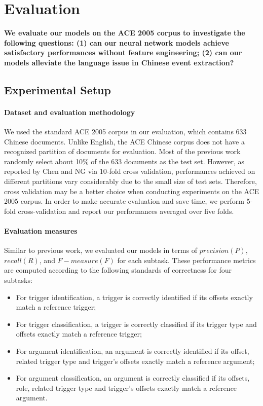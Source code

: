 \section{Evaluation}\label{experiments}
\textbf{We evaluate our models on the ACE 2005 corpus to investigate the following questions: (1) can our neural network models achieve satisfactory performances without feature engineering; (2) can our models alleviate the language issue in Chinese event extraction?}
\subsection{Experimental Setup}
\paragraph{Dataset and evaluation methodology}
We used the standard ACE 2005 corpus in our evaluation, which contains 633 Chinese documents. Unlike English, the ACE Chinese corpus does not have a recognized partition of documents for evaluation. Most of the previous work \cite{chen2009language,feng2016language} randomly select about 10\% of the 633 documents as the test set. However, as reported by Chen and NG  via 10-fold cross validation, performances achieved on different partitions vary considerably due to the small size of test sets. Therefore, cross validation may be a better choice when conducting experiments on the ACE 2005 corpus. In order to make accurate evaluation and save time, we perform 5-fold cross-validation and report our performances averaged over five folds.

\paragraph{Evaluation measures} Similar to previous work, we evaluated our models in terms of $precision (P)$, $recall (R)$, and $F{-}measure (F)$ for each subtask. These performance metrics are computed according to the following standards of correctness for four subtasks:
\begin{itemize}	
	\item For trigger identification, a trigger is correctly identified if its offsets exactly match a reference trigger;
	\item For trigger classification, a trigger is correctly classified if its trigger type and offsets exactly match a reference trigger;
	\item For argument identification, an argument is correctly identified if its offset, related trigger type and trigger’s offsets exactly match a reference argument;
	\item For argument classification, an argument is correctly classified if its offsets, role, related trigger type and trigger’s offsets exactly match a reference argument.
\end{itemize}

